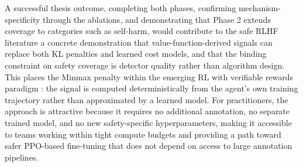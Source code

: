 \documentclass[a4paper,twoside,12pt]{report}
\begin{document}
A successful thesis outcome, completing both phases, confirming mechanism-specificity
through the ablations, and demonstrating that Phase 2 extends coverage to categories such
as self-harm, would contribute to the safe RLHF literature a concrete demonstration that
value-function-derived signals can replace both KL penalties and learned cost models, and
that the binding constraint on safety coverage is detector quality rather than algorithm
design. This places the Minmax penalty within the emerging RL with verifiable rewards
paradigm \citep{lambert2024rlvr, shao2024deepseekmath, safetyrlvr2025}: the signal is
computed deterministically from the agent's own training trajectory rather than
approximated by a learned model. For practitioners, the approach is attractive because it
requires no additional annotation, no separate trained model, and no new safety-specific
hyperparameters, making it accessible to teams working within tight compute budgets and
providing a path toward safer PPO-based fine-tuning that does not depend on access to
large annotation pipelines.


\end{document}
